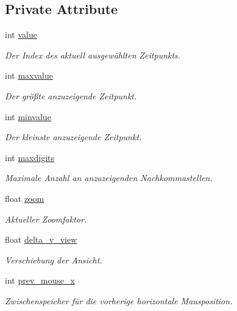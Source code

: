 \subsection*{Private Attribute}
\begin{DoxyCompactItemize}
\item 
int \hyperlink{classGUITimeline_a0ba036e4a58176c5e868662510717ae2}{value}
\begin{DoxyCompactList}\small\item\em Der Index des aktuell ausgewählten Zeitpunkts. \end{DoxyCompactList}\item 
int \hyperlink{classGUITimeline_a6c639803db9c5afff38d3221242da912}{maxvalue}
\begin{DoxyCompactList}\small\item\em Der größte anzuzeigende Zeitpunkt. \end{DoxyCompactList}\item 
int \hyperlink{classGUITimeline_aad9f2b796d0d7c086cfe0094b3ef10c5}{minvalue}
\begin{DoxyCompactList}\small\item\em Der kleinste anzuzeigende Zeitpunkt. \end{DoxyCompactList}\item 
int \hyperlink{classGUITimeline_a880c85a1838b77e7dd2c03601c15e36b}{maxdigits}
\begin{DoxyCompactList}\small\item\em Maximale Anzahl an anzuzeigenden Nachkommastellen. \end{DoxyCompactList}\item 
float \hyperlink{classGUITimeline_a9b5b63103a41b6e661cfb30acfcda448}{zoom}
\begin{DoxyCompactList}\small\item\em Aktueller Zoomfaktor. \end{DoxyCompactList}\item 
float \hyperlink{classGUITimeline_aba3c330e3e9e5f2f5edb069ecbb9c488}{delta\-\_\-v\-\_\-view}
\begin{DoxyCompactList}\small\item\em Verschiebung der Ansicht. \end{DoxyCompactList}\item 
int \hyperlink{classGUITimeline_a16d456832948e97e9364856f92d97f5c}{prev\-\_\-mouse\-\_\-x}
\begin{DoxyCompactList}\small\item\em Zwischenspeicher für die vorherige horizontale Mausposition. \end{DoxyCompactList}\item 

\end{DoxyCompactItemize}
